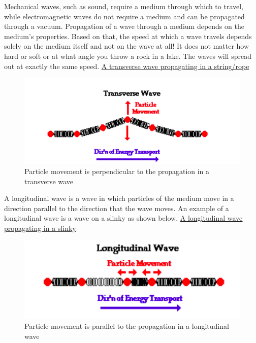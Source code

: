 \documentclass[oneside,hidelinks]{book}
\begin{document}
                Mechanical waves, such as sound, require a medium through which to travel, 
                while electromagnetic waves do not require a medium and can be propagated
                 through a vacuum. Propagation of a wave through a medium depends on the medium's 
                 properties. Based on that, the speed at which a wave travels depends solely on
                  the medium itself and not on the wave at all! It does not matter how hard or 
                  soft or at what angle you throw a rock in a lake. 
                The waves will spread out at exactly the same speed.
                \href{https://imgur.com/x7cjP8r}{\underline{A transverse wave propagating in a string/rope}}\\               
                \begin{figure}[hbtp]
                        \caption{Particle movement is perpendicular to the propagation in a transverse wave}
                        \hspace*{3cm}\includegraphics[scale=0.5]{trans.png}        
                \end{figure}

                A longitudinal wave is a wave in which particles of the medium 
                move in a direction parallel to the direction that the wave moves. 
                An example of a longitudinal wave is a wave on a slinky as shown below.
                \href{https://imgur.com/qAsFFSb}{\underline{A longitudinal wave propagating in a slinky}}\\
                \begin{figure}[hbtp]
                        \caption{Particle movement is parallel to the propagation in a longitudinal wave}
                        \hspace*{3cm}\includegraphics[scale=0.5]{longitudnal.png}
                \end{figure}
\end{document}
